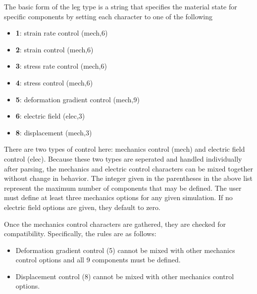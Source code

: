 \documentclass[letterpaper,10pt,english]{sphinxmanual}
\begin{document}
The basic form of the leg type is a string that specifies the material state for
specific components by setting each character to one of the following
\begin{itemize}
\item {} 
\textbf{1}: strain rate control (mech,6)

\item {} 
\textbf{2}: strain control (mech,6)

\item {} 
\textbf{3}: stress rate control (mech,6)

\item {} 
\textbf{4}: stress control (mech,6)

\item {} 
\textbf{5}: deformation gradient control (mech,9)

\item {} 
\textbf{6}: electric field (elec,3)

\item {} 
\textbf{8}: displacement (mech,3)

\end{itemize}

There are two types of control here: mechanics control (mech) and electric field
control (elec). Because these two types are seperated and handled individually
after parsing, the mechanics and electric control characters can be mixed
together without change in behavior. The integer given in the parentheses in the
above list represent the maximum number of components that may be defined. The
user must define at least three mechanics options for any given simulation. If no
electric field options are given, they default to zero.

Once the mechanics control characters are gathered, they are checked for
compatibility. Specifically, the rules are as follows:
\begin{itemize}
\item {} 
Deformation gradient control (5) cannot be mixed with other mechanics control
options and all 9 components must be defined.

\item {} 
Displacement control (8) cannot be mixed with other mechanics control
options.

\end{itemize}
\end{document}
